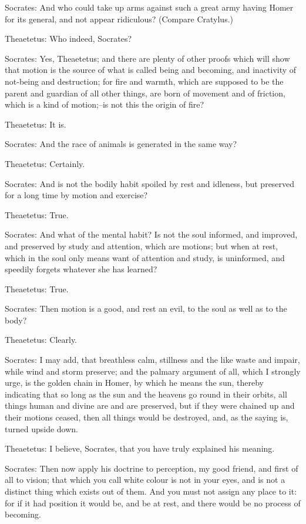 Socrates: And who could take up arms against such a great army having
Homer for its general, and not appear ridiculous? (Compare Cratylus.)

Theaetetus: Who indeed, Socrates?

Socrates: Yes, Theaetetus; and there are plenty of other proofs
which will show that motion is the source of what is called being and
becoming, and inactivity of not-being and destruction; for fire and
warmth, which are supposed to be the parent and guardian of all other
things, are born of movement and of friction, which is a kind of
motion;--is not this the origin of fire?

Theaetetus: It is.

Socrates: And the race of animals is generated in the same way?

Theaetetus: Certainly.

Socrates: And is not the bodily habit spoiled by rest and idleness, but
preserved for a long time by motion and exercise?

Theaetetus: True.

Socrates: And what of the mental habit? Is not the soul informed, and
improved, and preserved by study and attention, which are motions; but
when at rest, which in the soul only means want of attention and study,
is uninformed, and speedily forgets whatever she has learned?

Theaetetus: True.

Socrates: Then motion is a good, and rest an evil, to the soul as well
as to the body?

Theaetetus: Clearly.

Socrates: I may add, that breathless calm, stillness and the like waste
and impair, while wind and storm preserve; and the palmary argument of
all, which I strongly urge, is the golden chain in Homer, by which
he means the sun, thereby indicating that so long as the sun and the
heavens go round in their orbits, all things human and divine are and
are preserved, but if they were chained up and their motions ceased,
then all things would be destroyed, and, as the saying is, turned upside
down.

Theaetetus: I believe, Socrates, that you have truly explained his
meaning.

Socrates: Then now apply his doctrine to perception, my good friend, and
first of all to vision; that which you call white colour is not in your
eyes, and is not a distinct thing which exists out of them. And you must
not assign any place to it: for if it had position it would be, and be
at rest, and there would be no process of becoming.

